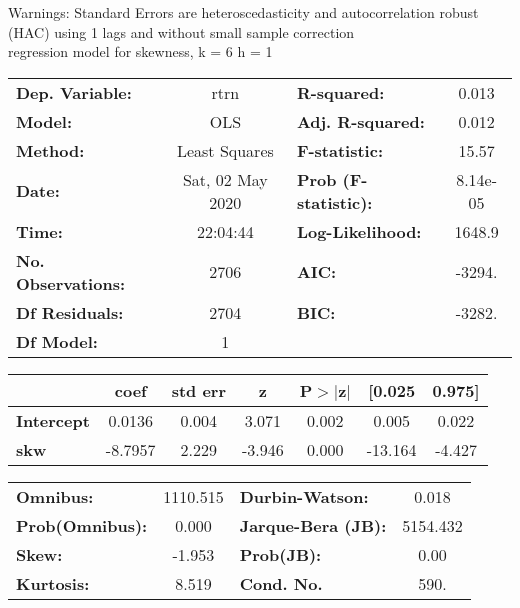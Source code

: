 Warnings: \newline
 [1] Standard Errors are heteroscedasticity and autocorrelation robust (HAC) using 1 lags and without small sample correction\\ 

regression model for skewness, k = 6 h = 1\begin{center}
\begin{tabular}{lclc}
\toprule
\textbf{Dep. Variable:}    &       rtrn       & \textbf{  R-squared:         } &     0.013   \\
\textbf{Model:}            &       OLS        & \textbf{  Adj. R-squared:    } &     0.012   \\
\textbf{Method:}           &  Least Squares   & \textbf{  F-statistic:       } &     15.57   \\
\textbf{Date:}             & Sat, 02 May 2020 & \textbf{  Prob (F-statistic):} &  8.14e-05   \\
\textbf{Time:}             &     22:04:44     & \textbf{  Log-Likelihood:    } &    1648.9   \\
\textbf{No. Observations:} &        2706      & \textbf{  AIC:               } &    -3294.   \\
\textbf{Df Residuals:}     &        2704      & \textbf{  BIC:               } &    -3282.   \\
\textbf{Df Model:}         &           1      & \textbf{                     } &             \\
\bottomrule
\end{tabular}
\begin{tabular}{lcccccc}
                   & \textbf{coef} & \textbf{std err} & \textbf{z} & \textbf{P$> |$z$|$} & \textbf{[0.025} & \textbf{0.975]}  \\
\midrule
\textbf{Intercept} &       0.0136  &        0.004     &     3.071  &         0.002        &        0.005    &        0.022     \\
\textbf{skw}       &      -8.7957  &        2.229     &    -3.946  &         0.000        &      -13.164    &       -4.427     \\
\bottomrule
\end{tabular}
\begin{tabular}{lclc}
\textbf{Omnibus:}       & 1110.515 & \textbf{  Durbin-Watson:     } &    0.018  \\
\textbf{Prob(Omnibus):} &   0.000  & \textbf{  Jarque-Bera (JB):  } & 5154.432  \\
\textbf{Skew:}          &  -1.953  & \textbf{  Prob(JB):          } &     0.00  \\
\textbf{Kurtosis:}      &   8.519  & \textbf{  Cond. No.          } &     590.  \\
\bottomrule
\end{tabular}
\end{center}

